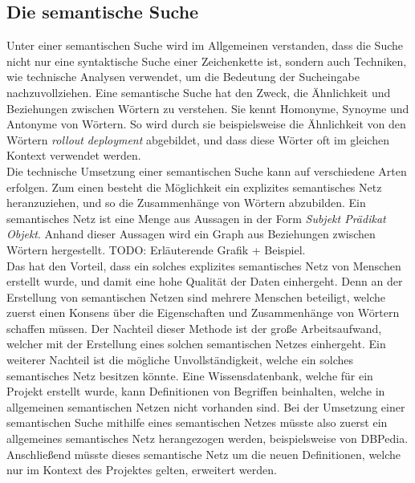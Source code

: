 \subsection{Die semantische Suche}
Unter einer semantischen Suche wird im Allgemeinen verstanden, dass die Suche nicht nur eine syntaktische Suche einer Zeichenkette ist, sondern auch Techniken, wie technische Analysen verwendet, um die Bedeutung der Sucheingabe nachzuvollziehen.\cite{Dengel_2012}
Eine semantische Suche hat den Zweck, die Ähnlichkeit und Beziehungen zwischen Wörtern zu verstehen.
Sie kennt Homonyme, Synoyme und Antonyme von Wörtern.  
So wird durch sie beispielsweise die Ähnlichkeit von den Wörtern \textit{rollout} \textit{deployment} abgebildet, und dass diese Wörter oft im gleichen Kontext verwendet werden.\\

Die technische Umsetzung einer semantischen Suche kann auf verschiedene Arten erfolgen.
Zum einen besteht die Möglichkeit ein explizites semantisches Netz heranzuziehen, und so die Zusammenhänge von Wörtern abzubilden.
Ein semantisches Netz ist eine Menge aus Aussagen in der Form \textit{Subjekt Prädikat Objekt}.
Anhand dieser Aussagen wird ein Graph aus Beziehungen zwischen Wörtern hergestellt.\cite{Lehmann}
TODO: Erläuterende Grafik + Beispiel.\\
Das hat den Vorteil, dass ein solches explizites semantisches Netz von Menschen erstellt wurde, und damit eine hohe Qualität der Daten einhergeht.
Denn an der Erstellung von semantischen Netzen sind mehrere Menschen beteiligt, welche zuerst einen Konsens über die Eigenschaften und Zusammenhänge von Wörtern schaffen müssen.
Der Nachteil dieser Methode ist der große Arbeitsaufwand, welcher mit der Erstellung eines solchen semantischen Netzes einhergeht.
Ein weiterer Nachteil ist die mögliche Unvollständigkeit, welche ein solches semantisches Netz besitzen könnte.
Eine Wissensdatenbank, welche für ein Projekt erstellt wurde, kann Definitionen von Begriffen beinhalten, welche in allgemeinen semantischen Netzen nicht vorhanden sind.
Bei der Umsetzung einer semantischen Suche mithilfe eines semantischen Netzes müsste also zuerst ein allgemeines semantisches Netz herangezogen werden, beispielsweise von DBPedia.
Anschließend müsste dieses semantische Netz um die neuen Definitionen, welche nur im Kontext des Projektes gelten, erweitert werden.\\

